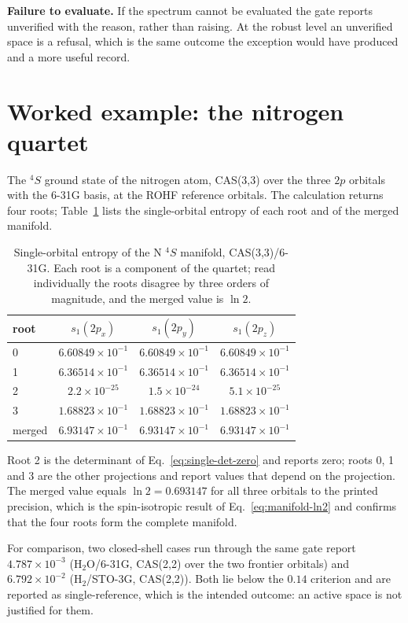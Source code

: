 \textbf{Failure to evaluate.}  If the spectrum cannot be evaluated the
gate reports unverified with the reason, rather than raising.  At the
robust level an unverified space is a refusal, which is the same
outcome the exception would have produced and a more useful record.

\section{Worked example: the nitrogen quartet}
\label{sec:manifold-example}

The $^{4}S$ ground state of the nitrogen atom, CAS(3,3) over the three
$2p$ orbitals with the 6-31G basis, at the ROHF reference orbitals.
The calculation returns four roots; Table~\ref{tab:manifold-n} lists
the single-orbital entropy of each root and of the merged manifold.

\begin{table}[h]
\centering
\caption{Single-orbital entropy of the N $^{4}S$ manifold,
CAS(3,3)/6-31G.  Each root is a component of the quartet; read
individually the roots disagree by three orders of magnitude, and the
merged value is $\ln 2$.}
\label{tab:manifold-n}
\begin{tabular}{lccc}
\toprule
root & $s_{1}(2p_x)$ & $s_{1}(2p_y)$ & $s_{1}(2p_z)$ \\
\midrule
0 & $6.60849\times10^{-1}$ & $6.60849\times10^{-1}$ & $6.60849\times10^{-1}$ \\
1 & $6.36514\times10^{-1}$ & $6.36514\times10^{-1}$ & $6.36514\times10^{-1}$ \\
2 & $2.2\times10^{-25}$ & $1.5\times10^{-24}$ & $5.1\times10^{-25}$ \\
3 & $1.68823\times10^{-1}$ & $1.68823\times10^{-1}$ & $1.68823\times10^{-1}$ \\
\midrule
merged & $6.93147\times10^{-1}$ & $6.93147\times10^{-1}$ & $6.93147\times10^{-1}$ \\
\bottomrule
\end{tabular}
\end{table}

Root 2 is the determinant of Eq.~\eqref{eq:single-det-zero} and
reports zero; roots 0, 1 and 3 are the other projections and report
values that depend on the projection.  The merged value equals
$\ln 2=0.693147$ for all three orbitals to the printed precision,
which is the spin-isotropic result of
Eq.~\eqref{eq:manifold-ln2} and confirms that the four roots form the
complete manifold.

For comparison, two closed-shell cases run through the same gate
report $4.787\times10^{-3}$ (H$_2$O/6-31G, CAS(2,2) over the two
frontier orbitals) and $6.792\times10^{-2}$ (H$_2$/STO-3G, CAS(2,2)).
Both lie below the $0.14$ criterion and are reported as
single-reference, which is the intended outcome: an active space is
not justified for them.

